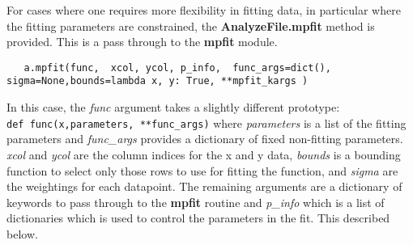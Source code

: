 \documentclass[a4paper,11pt]{scrartcl}
\begin{document}
For cases where one requires more flexibility in fitting data, in particular
where the fitting parameters are constrained, the \textbf{AnalyzeFile.mpfit}
method is provided. This is a pass through to the \textbf{mpfit} module.

\begin{lstlisting}
   a.mpfit(func,  xcol, ycol, p_info,  func_args=dict(), sigma=None,bounds=lambda x, y: True, **mpfit_kargs )
\end{lstlisting}

In this case, the \textit{func} argument takes a slightly different
prototype:\\\verb:def func(x,parameters, **func_args): where \textit{parameters}
is a list of the fitting parameters and \textit{func\_args} provides a
dictionary of fixed \ie non-fitting parameters. \textit{xcol} and \textit{ycol}
are the column indices for the x and y data, \textit{bounds} is a bounding
function to select only those rows to use for fitting the function, and
\textit{sigma} are the weightings for each datapoint. The remaining arguments
are a dictionary of keywords to pass through to the \textbf{mpfit} routine and
\textit{p\_info} which is a list of dictionaries which is used to control the
parameters in the fit. This described below.
\end{document}
